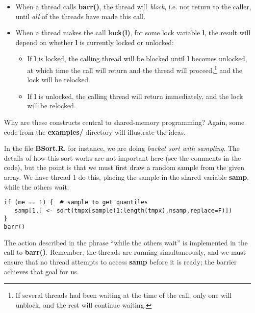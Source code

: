 \documentclass[11pt]{article}
\begin{document}
\begin{itemize}

\item When a thread calls {\bf barr()}, the thread will {\it block},
i.e. not return to the caller, until {\it all} of the threads have made
this call.

\item When a thread makes the call {\bf lock(l)}, for some lock variable
{\bf l}, the result will depend on whether {\bf l} is currently locked
or unlocked:

   \begin{itemize}

   \item If {\bf l} is locked, the calling thread will be blocked until
   {\bf l} becomes unlocked, at which time the call will return and the
   thread will proceed,\footnote{If several threads had been waiting at
   the time of the call, only one will unblock, and the rest will
   continue waiting.} and the lock will be relocked.

   \item If {\bf l} is unlocked, the calling thread will return
   immediately, and the lock will be relocked.

   \end{itemize}

\end{itemize}

Why are these constructs central to shared-memory programming?  Again,
some code from the {\bf examples/} directory will illustrate the ideas.

In the file {\bf BSort.R}, for instance, we are doing {\it bucket sort
with sampling}.  The details of how this sort works are not important
here (see the comments in the code), but the point is that we must first
draw a random sample from the given array.  We have thread 1 do this,
placing the sample in the shared variable {\bf samp}, while the others
wait:

\begin{lstlisting}
if (me == 1) {  # sample to get quantiles
   samp[1,] <- sort(tmpx[sample(1:length(tmpx),nsamp,replace=F)])
}
barr()
\end{lstlisting}

The action described in the phrase ``while the others wait'' is
implemented in the call to {\bf barr()}.  Remember, the threads are
running simultaneously, and we must ensure that no thread attempts to
access {\bf samp} before it is ready; the barrier achieves that goal for
us.
\end{document}
